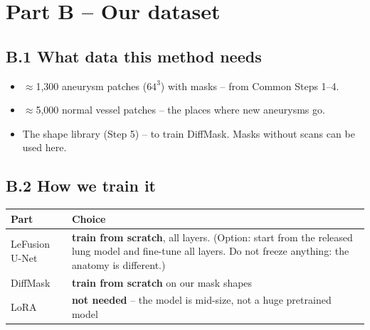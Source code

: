 \documentclass[11pt,a4paper,oneside]{report}
\begin{document}
\section{Part B -- Our dataset}

\subsection*{B.1 What data this method needs}
\begin{itemize}
  \item $\approx$1{,}300 aneurysm patches ($64^3$) with masks -- from Common Steps 1--4.
  \item $\approx$5{,}000 normal vessel patches -- the places where new aneurysms go.
  \item The shape library (Step 5) -- to train DiffMask. Masks without scans can be used here.
\end{itemize}

\subsection*{B.2 How we train it}
\begin{center}
\small
\begin{tabularx}{\linewidth}{lX}
\toprule
\textbf{Part} & \textbf{Choice} \\
\midrule
LeFusion U-Net & \textbf{train from scratch}, all layers. (Option: start from the released lung model and fine-tune all layers. Do not freeze anything: the anatomy is different.) \\
DiffMask & \textbf{train from scratch} on our mask shapes \\
LoRA & \textbf{not needed} -- the model is mid-size, not a huge pretrained model \\
\bottomrule
\end{tabularx}
\end{center}
\end{document}
